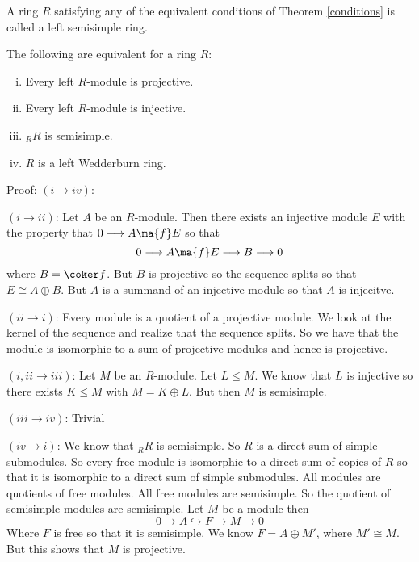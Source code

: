 \begin{dfn}
A ring $R$ satisfying any of the equivalent conditions of Theorem \ref{conditions} is called a left semisimple ring. 
\end{dfn}

\begin{thm}\label{conditions}
The following are equivalent for a ring $R$:
\begin{enumerate}[(i)]
\item Every left $R$-module is projective.
\item Every left $R$-module is injective. 
\item $_R R$ is semisimple.
\item $R$ is a left Wedderburn ring. 
\end{enumerate}
\end{thm}

Proof: $(i\rightarrow iv)$: 

$(i \rightarrow ii)$: Let $A$ be an $R$-module. Then there exists an injective module $E$ with the property that $0 \longrightarrow A \ma{f} E$ so that
\[
0 \longrightarrow A \ma{f} E \longrightarrow B \longrightarrow 0
\]
where $B= \coker f$. But $B$ is projective so the sequence splits so that $E \cong A \oplus B$. But $A$ is a summand of an injective module so that $A$ is injecitve. 

$(ii \rightarrow i)$: Every module is a quotient of a projective module. We look at the kernel of the sequence and realize that the sequence splits. So we have that the module is isomorphic to a sum of projective modules and hence is projective. 

$(i,ii \rightarrow iii)$: Let $M$ be an $R$-module. Let $L \leq M$. We know that $L$ is injective so there exists $K \leq M$ with $M=K \oplus L$. But then $M$ is semisimple. 

$(iii \rightarrow iv)$: Trivial

$(iv \rightarrow i)$: We know that $_R R$ is semisimple. So $R$ is a direct sum of simple submodules. So every free module is isomorphic to a direct sum of copies of $R$ so that it is isomorphic to a direct sum of simple submodules. All modules are quotients of free modules. All free modules are semisimple. So the quotient of semisimple modules are semisimple. Let $M$ be a module then
\[
0 \longrightarrow A \hookrightarrow F \longrightarrow M \longrightarrow 0
\]
Where $F$ is free so that it is semisimple. We know $F=A \oplus M'$, where $M' \cong M$. But this shows that $M$ is projective. 

